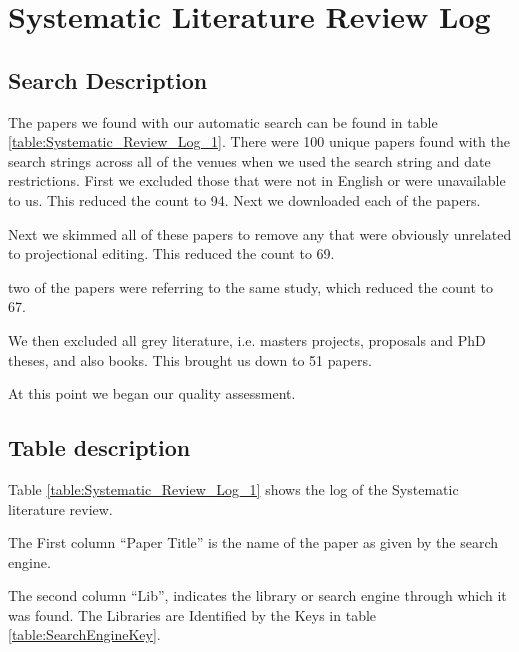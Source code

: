 \chapter{Systematic Literature Review Log} \label{Appendix:SLRLog}

\section*{Search Description} 
The papers we found with our automatic search can be found in table \ref{table:Systematic_Review_Log_1}.
There were 100 unique papers found with the search strings across all of the venues when we used the search string and date restrictions.
First we excluded those that were not in English or were unavailable to us.
This reduced the count to 94.
Next we downloaded each of the papers.

Next we skimmed all of these papers to remove any that were obviously unrelated to projectional editing.
This reduced the count to 69.

two of the papers were referring to the same study, which reduced the count to 67.

We then excluded all grey literature, i.e. masters projects, proposals and PhD theses, and also books.
This brought us down to 51 papers.

At this point we began our quality assessment.

\section*{Table description}
Table \ref{table:Systematic_Review_Log_1} shows the log of the Systematic literature review.

The First column ``Paper Title'' is the name of the paper as given by the search engine.

The second column ``Lib'', indicates the library or search engine through which it was found.
The Libraries are Identified by the Keys in table \ref{table:SearchEngineKey}.


